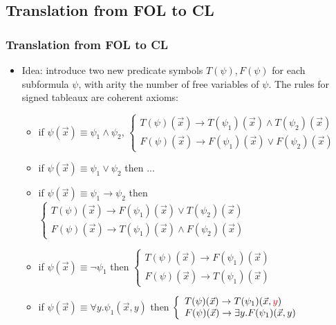 \documentclass[handout,11pt]{beamer}
\newcommand{\red}[1]{\textcolor{red}{#1}}
\begin{document}
\subsection{Translation from FOL to CL}
\begin{frame}
\frametitle{Translation from FOL to CL}
 \begin{itemize}[<+->]
   \item Idea: introduce two new predicate symbols 
   $T(\psi),F(\psi)$ for each subformula $\psi$, 
   with arity the number of free variables of $\psi$.
   The rules for signed tableaux are coherent axioms:
   \begin{itemize} 
   \item 
 if $\psi(\vec{x})\equiv\psi_1\wedge\psi_2$,
$\left\{\begin{array}{ll}
T(\psi)(\vec{x})\to T(\psi_1)(\vec{x})\wedge T(\psi_2)(\vec{x})\\
F(\psi)(\vec{x})\to F(\psi_1)(\vec{x})\vee F(\psi_2)(\vec{x})
\end{array}\right.$

\item

 if $\psi(\vec{x})\equiv\psi_1\vee \psi_2$ then ...

\item
  if $\psi(\vec{x})\equiv\psi_1\to \psi_2$ then 
$\left\{\begin{array}{ll}
T(\psi)(\vec{x})\to F(\psi_1)(\vec{x})\vee T(\psi_2)(\vec{x})\\
F(\psi)(\vec{x})\to T(\psi_1)(\vec{x})\wedge F(\psi_2)(\vec{x})
\end{array}\right.$

\item

 if $\psi(\vec{x})\equiv\neg \psi_1$ then 
$\left\{\begin{array}{ll}
T(\psi)(\vec{x})\to F(\psi _1)(\vec{x})\\
F(\psi)(\vec{x})\to T(\psi _1)(\vec{x})
\end{array}\right.$

\item

 if $\psi(\vec{x})\equiv\forall y.\psi_1(\vec{x},y)$ then 
$\left\{\begin{array}{ll}
T(\psi)(\vec{x})\to T(\psi_1)(\vec{x},\red{y})\\
F(\psi)(\vec{x})\to \exists y.F(\psi_1)(\vec{x},y)
\end{array}\right.$


\end{itemize}
\end{itemize}
\end{frame}
\end{document}
